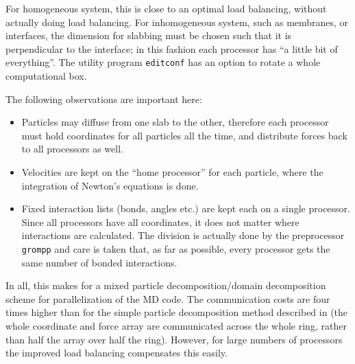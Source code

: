 For homogeneous system, this is close to an optimal load balancing,
without actually doing load balancing. For inhomogeneous system, such
as membranes, or interfaces, the dimension for slabbing must be chosen
such that it is perpendicular to the interface; in this fashion each
processor has ``a little bit of everything''.  The {\gromacs} utility
program {\tt editconf} has an option to rotate a whole
computational box.

The following observations are important here:
\begin{itemize}
\item	Particles may diffuse from one slab to the other, therefore each processor
	must hold coordinates for all particles all the time, and distribute forces
	back to all processors as well.
\item	Velocities are kept on the ``home processor'' for each particle,
	where the integration of Newton's equations is done.
\item	Fixed interaction lists (bonds, angles etc.) are kept each
	on a single processor.  Since all processors have all
	coordinates, it does not matter where interactions are
	calculated.  The division is actually done by the {\gromacs}
	preprocessor {\tt grompp} and care is taken that, as far as
	possible, every processor gets the same number of bonded
	interactions.
\end{itemize}

In all, this makes for a mixed particle decomposition/domain decomposition scheme
for parallelization of the MD code. The communication costs are four times higher
than for the simple particle decomposition method described in 
(the whole coordinate and force array are communicated across the whole ring,
rather than half the array over half the ring).
However, for large numbers of processors the improved load balancing 
compensates this easily.


